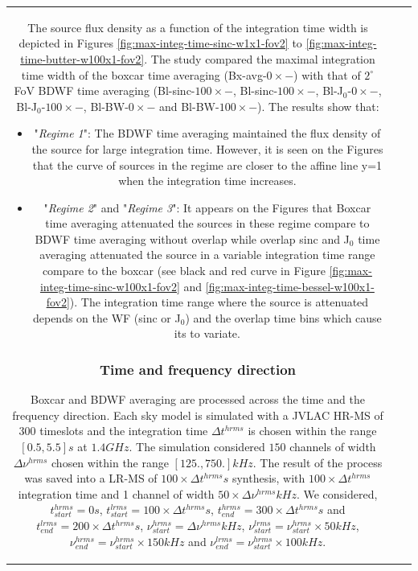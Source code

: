 \documentclass[useAMS,usenatbib]{mn2e}
\begin{document}
\begin{tabular}{*3{c}}
The source flux density as a function of the integration time width is depicted in Figures \ref{fig:max-integ-time-sinc-w1x1-fov2} to 
 \ref{fig:max-integ-time-butter-w100x1-fov2}. The study compared the maximal integration time width of the boxcar time  averaging 
(Bx-avg-$0\times -$) 
with that of  $2^{\circ}$ FoV BDWF time averaging (Bl-sinc-$100\times -$, Bl-sinc-$100\times -$, Bl-J$_0$-$0\times -$, 
Bl-J$_0$-$100\times-$, Bl-BW-$0\times -$ and Bl-BW-$100\times -$). 
The results show that:
\begin{itemize}
 \item "\textit{Regime 1}":  The BDWF time averaging maintained the flux density of the source for large integration time. 
However, 
it is seen on the Figures that the curve of sources in the regime are closer to the affine line y=1 when the integration time increases.
 \item  "\textit{Regime 2}" and "\textit{Regime 3}": It appears on the Figures that Boxcar time averaging attenuated the sources in 
these regime compare to BDWF time averaging without overlap while overlap sinc and J$_0$ time averaging attenuated the source in a variable 
integration time range compare to the boxcar (see black and red curve in Figure \ref{fig:max-integ-time-sinc-w100x1-fov2} and 
\ref{fig:max-integ-time-bessel-w100x1-fov2}). The integration time range where the source is attenuated  depends on the 
WF (sinc or J$_0$) and the overlap time bins which cause its to variate. 
\end{itemize}
\subsubsection{Time and frequency direction}
Boxcar and BDWF averaging are processed across the time and the frequency direction.
Each sky model is simulated with a JVLAC HR-MS of $300$ timeslots and  the integration time $\Delta 
t^{hrms}$ is chosen within the range $[0.5,5.5]s$ at $1.4GHz$. The simulation considered $150$ channels of width $\Delta 
\nu^{hrms}$  chosen within the range $[125.,750.]kHz$.  The result of the process was saved into a LR-MS of  $100\times\Delta t^{hrms}s$ 
synthesis, with 
$100\times\Delta t^{hrms}$ integration time and 1 channel of width $50\times\Delta \nu^{hrms}kHz$.  We considered, 
$t^{hrms}_{start}=0s$, $t^{lrms}_{start}=100\times\Delta t^{hrms} s$, $t^{hrms}_{end}=300\times\Delta t^{hrms}s$ and 
$t^{lrms}_{end}=200\times\Delta t^{hrms}s$, $\nu^{hrms}_{start}=\Delta 
\nu^{hrms}kHz$, $\nu^{lrms}_{start}=\nu^{hrms}_{start}\times50 kHz$, $\nu^{hrms}_{end}=\nu^{hrms}_{start}\times150 kHz$ and 
$\nu^{lrms}_{end}=\nu^{hrms}_{start}\times100 kHz$.


\end{tabular}
\end{document}
